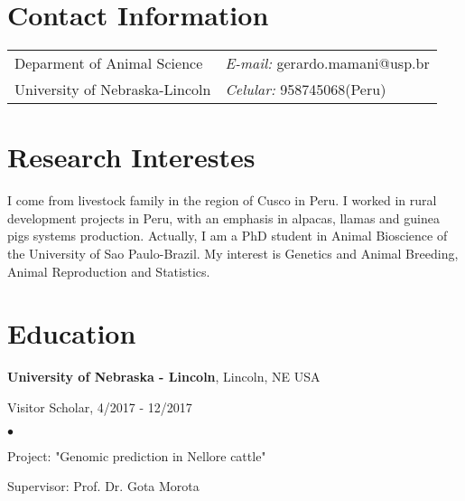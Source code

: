 \documentclass[margin,line,10pt]{res}
\newenvironment{list1}{
  \begin{list}{\ding{113}}{%
      \setlength{\itemsep}{0in}
      \setlength{\parsep}{0in} \setlength{\parskip}{0in}
      \setlength{\topsep}{0in} \setlength{\partopsep}{0in} 
      \setlength{\leftmargin}{0.17in}}}{\end{list}}
\newenvironment{list2}{
  \begin{list}{$\bullet$}{%
      \setlength{\itemsep}{0in}
      \setlength{\parsep}{0in} \setlength{\parskip}{0in}
      \setlength{\topsep}{0in} \setlength{\partopsep}{0in} 
      \setlength{\leftmargin}{0.2in}}}{\end{list}}
\begin{document}

\begin{resume}
\section{\sc Contact Information}
\vspace{.05in}
\begin{tabular}{@{}p{3in}p{4in}}
Deparment of Animal Science    & \hspace{2.5cm} {\it E-mail:}  gerardo.mamani@usp.br\\       
University of Nebraska-Lincoln  & \hspace{2.5cm} {\it Celular:} 958745068(Peru)\\     

\end{tabular}

\vspace{0.3cm}
\section{\sc Research Interestes}
I come from livestock family in the region of Cusco in Peru. I worked in rural development projects in Peru, with an emphasis in alpacas, llamas and guinea pigs systems production. Actually, I am a PhD student in Animal Bioscience of the University of Sao Paulo-Brazil. My interest is Genetics and Animal Breeding, Animal Reproduction and Statistics. 
 
\section{\sc Education}

{\bf University of Nebraska - Lincoln}, Lincoln, NE USA\\
\vspace*{-.1in}
\begin{list1}
\item[] Visitor Scholar, 4/2017 - 12/2017
\begin{list2}
\vspace*{.05in}
\item Project: "Genomic prediction in Nellore cattle" 
\item Supervisor: Prof. Dr. Gota Morota
\end{list2}
\vspace*{.05in}
\end{list1}


\end{resume}
\end{document}
